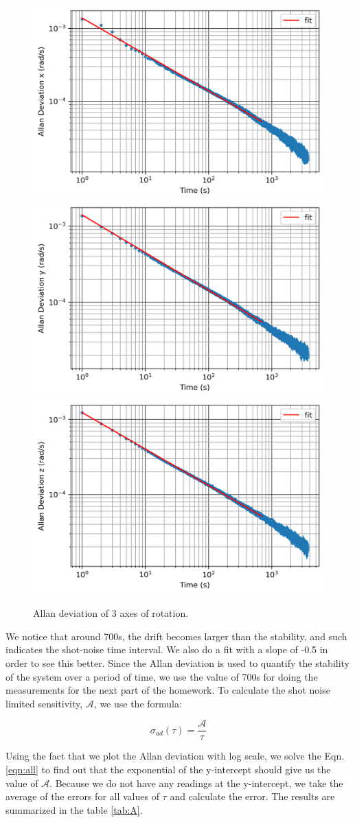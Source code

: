 \documentclass[a4paper]{article}
\begin{document}
\begin{figure}[hbt!]
     \centering
	 {{\includegraphics[width=0.4\columnwidth]{allan_x.png}}}
	 {{\includegraphics[width=0.4\columnwidth]{allan_y.png}}}
	 {{\includegraphics[width=0.4\columnwidth]{allan_z.png}}}
	 \caption{Allan deviation of 3 axes of rotation.}
	 \label{fig:fft}
\end{figure}

We notice that around 700s, the drift becomes larger than the stability, and such indicates the shot-noise time interval. We also do a fit with a slope of -0.5 in order to see this better. Since the Allan deviation is used to quantify the stability of the system over a period of time, we use the value of 700s for doing the measurements for the next part of the homework. 
To calculate the shot noise limited sensitivity, $\mathcal{A}$, we use the formula: 

\begin{equation} \label{eqn:all}
     \sigma_{ad}(\tau) = \frac{\mathcal{A}}{\tau}
\end{equation}

Using the fact that we plot the Allan deviation with log scale, we solve the Eqn. \ref{eqn:all} to find out that the exponential of the y-intercept should give us the value of $\mathcal{A}$. Because we do not have any readings at the y-intercept, we take the average of the errors for all values of $\tau$ and calculate the error. The results are summarized in the table \ref{tab:A}.
\end{document}
